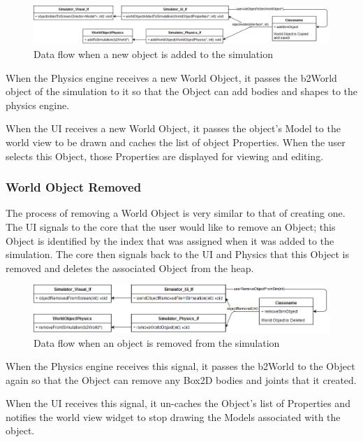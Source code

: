  	\begin{figure}[h]
 		\centering
 		\includegraphics[width=\textwidth]{./images_design/uml/event_addObject}
 		\caption{Data flow when a new object is added to the simulation\label{uml:addevent}}
 	\end{figure}
 	
 	When the Physics engine receives a new World Object, it passes the b2World object
of the simulation to it so that the Object can add bodies and shapes to the physics engine.

	When the UI receives a new World Object, it passes the object's Model to the world view to be drawn and caches the list of object Properties. When the user selects this Object, those Properties are displayed for viewing and editing.
	
 \subsubsection*{World Object Removed}
 The process of removing a World Object is very similar to that of creating one. The UI signals to the core that the user would like to remove an Object; this Object is identified by the index that was assigned when it was added to the simulation. The core then signals back to the UI and Physics that this Object is removed and deletes the associated Object from the heap.
 
 	\begin{figure}[h]
 		\centering
 		\includegraphics[width=\textwidth]{./images_design/uml/event_removeObject}
 		\caption{Data flow when an object is removed from the simulation\label{uml:removeevent}}
 	\end{figure} 
 
 When the Physics engine receives this signal, it passes the b2World to the Object again so that the Object can remove any Box2D bodies and joints that it created.
 
 When the UI receives this signal, it un-caches the Object's list of Properties and notifies the world view widget to stop drawing the Models associated with the object.
 
